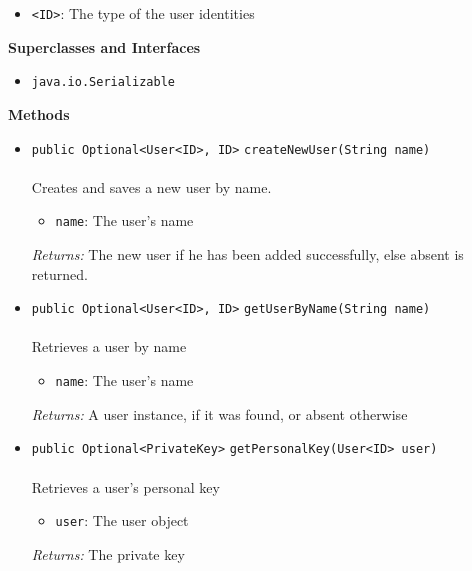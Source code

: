 \begin{itemize}
\item \lstinline|<ID>|: The type of the user identities
\end{itemize}


\textbf{\sffamily Superclasses and Interfaces}
\begin{itemize}
\item \lstinline|java.io.Serializable|
\end{itemize}



\textbf{\sffamily Methods}
\begin{itemize}
\item \lstinline|public Optional<User<ID>, ID>| \lstinline|createNewUser|\lstinline|(String name)|\\ \\[-0.6em]
Creates and saves a new user by name.
\begin{itemize}
\item \lstinline|name|: The user's name
\end{itemize}

\emph{Returns:} The new user if he has been added successfully, else absent is returned.

\item \lstinline|public Optional<User<ID>, ID>| \lstinline|getUserByName|\lstinline|(String name)|\\ \\[-0.6em]
Retrieves a user by name
\begin{itemize}
\item \lstinline|name|: The user's name
\end{itemize}

\emph{Returns:} A user instance, if it was found, or absent otherwise

\item \lstinline|public Optional<PrivateKey>| \lstinline|getPersonalKey|\lstinline|(User<ID> user)|\\ \\[-0.6em]
Retrieves a user's personal key
\begin{itemize}
\item \lstinline|user|: The user object
\end{itemize}

\emph{Returns:} The private key

\end{itemize}

